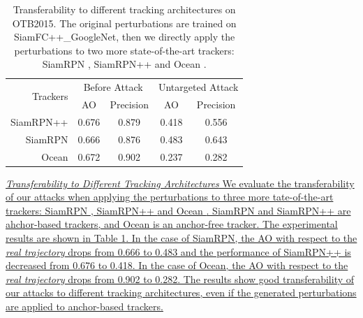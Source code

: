 \documentclass[journal]{IEEEtran}
\begin{document}
\begin{table}[t]
  \centering
  \caption{Transferability to different tracking architectures on OTB2015. The original perturbations are trained on SiamFC++\_GoogleNet, then we directly apply the perturbations to two more state-of-the-art trackers: SiamRPN \cite{SiamRPN}, SiamRPN++ \cite{SiamRPN++} and Ocean \cite{zhang2020ocean}.}
  \begin{tabular}{rcccc} 
  \toprule
  \multirow{2}{*}[-2pt]{Trackers} & \multicolumn{2}{c}{Before Attack} & \multicolumn{2}{c}{Untargeted Attack}  \\
  \cmidrule{2-5}
                            & AO & Precision              & AO & Precision                   \\
  \midrule
  SiamRPN++                 & 0.676   & 0.879                  & 0.418   & 0.556                       \\
  SiamRPN                   & 0.666   & 0.876                  & 0.483   & 0.643                       \\
  Ocean                     & 0.672   & 0.902             & 0.237 & 0.282     \\ \bottomrule
  \end{tabular}
  \label{tab:arch}
\end{table}
\uline{\textit{Transferability to Different Tracking Architectures} We evaluate the transferability of our attacks when applying the perturbations to three more tate-of-the-art trackers: SiamRPN \cite{SiamRPN}, SiamRPN++ \cite{SiamRPN++} and Ocean \cite{zhang2020ocean}. SiamRPN and SiamRPN++ are ahchor-based trackers, and Ocean is an anchor-free tracker.
The experimental results are shown in Table \ref{tab:arch}. In the case of SiamRPN, the AO with respect to the \textit{real trajectory} drops from 0.666 to 0.483 and the performance of SiamRPN++ is decreased from 0.676 to 0.418.
In the case of Ocean, the AO with respect to the \textit{real trajectory} drops from 0.902 to 0.282.
The results show good transferability of our attacks to different tracking architectures, even if the generated perturbations are applied to anchor-based trackers.
}
\end{document}
